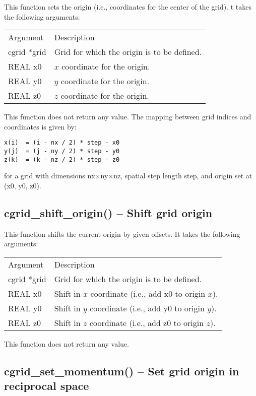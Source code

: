 \documentclass[12pt,letterpaper]{report}
\begin{document}
This function sets the origin (i.e., coordinates for the center of the grid). t takes the following arguments:
\begin{longtable}{p{} p{}}
Argument & Description\\
\cline{1-2}
cgrid *grid & Grid for which the origin is to be defined.\\
REAL x0 & $x$ coordinate for the origin.\\
REAL y0 & $y$ coordinate for the origin.\\
REAL z0 & $z$ coordinate for the origin.\\
\end{longtable}
\noindent
This function does not return any value. The mapping between grid indices and coordinates is given by:
\begin{verbatim}
x(i)  = (i - nx / 2) * step - x0
y(j)  = (j - ny / 2) * step - y0
z(k)  = (k - nz / 2) * step - z0
\end{verbatim}
for a grid with dimensions nx$\times$ny$\times$nz, spatial step length step, and origin set at (x0, y0, z0).

\subsection{cgrid\_shift\_origin() -- Shift grid origin}

This function shifts the current origin by given offsets. It takes the following arguments:
\begin{longtable}{p{} p{}}
Argument & Description\\
\cline{1-2}
cgrid *grid & Grid for which the origin is to be defined.\\
REAL x0 & Shift in $x$ coordinate (i.e., add x0 to origin $x$).\\
REAL y0 & Shift in $y$ coordinate (i.e., add y0 to origin $y$).\\
REAL z0 & Shift in $z$ coordinate (i.e., add z0 to origin $z$).\\
\end{longtable}
\noindent
This function does not return any value.

\subsection{cgrid\_set\_momentum() -- Set grid origin in reciprocal space}
\end{document}
